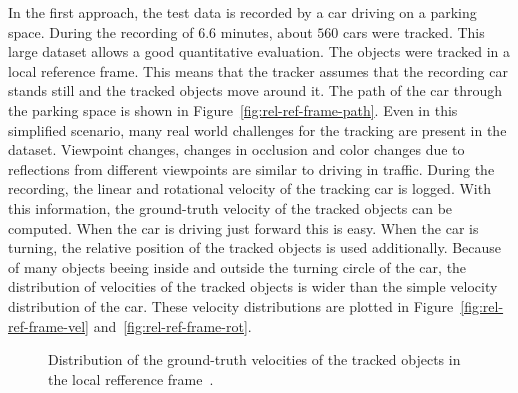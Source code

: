 \documentclass[twoside,a4paper,article]{combine}
\begin{document}
In the first approach, the test data is recorded by a car driving on a
parking space. During the recording of $6.6$ minutes, about $560$ cars
were tracked. This large dataset allows a good quantitative
evaluation. The objects were tracked in a local reference frame. This
means that the tracker assumes that the recording car stands still and
the tracked objects move around it. The path of the car through the
parking space is shown in Figure~\ref{fig:rel-ref-frame-path}. Even in
this simplified scenario, many real world challenges for the tracking
are present in the dataset. Viewpoint changes, changes in occlusion
and color changes due to reflections from different viewpoints are
similar to driving in traffic. During the recording, the linear and
rotational velocity of the tracking car is logged. With this
information, the ground-truth velocity of the tracked objects can be
computed. When the car is driving just forward this is easy. When the car
is turning, the relative position of the tracked objects is used
additionally. Because of many objects beeing inside and outside the
turning circle of the car, the distribution of velocities of the
tracked objects is wider than the simple velocity distribution of the
car. These velocity distributions are plotted in
Figure~\ref{fig:rel-ref-frame-vel} and~\ref{fig:rel-ref-frame-rot}.
\begin{figure}
  \center
  \caption{Distribution of the ground-truth velocities of the tracked
    objects in the local refference frame~\cite{paper}.}
  \label{fig:rel-ref-frame}
\end{figure}
\end{document}
